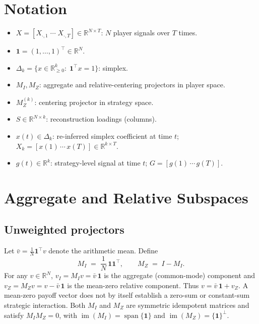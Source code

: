\documentclass[11pt]{article}
\newcommand{\one}{\mathbf{1}}
\newcommand{\R}{\mathbb{R}}
\begin{document}
\section{Notation}
\begin{itemize}[leftmargin=*]
\item $X=[X_{\cdot,1}\;\cdots\;X_{\cdot,T}] \in \R^{N\times T}$: $N$ player signals over $T$ times.
\item $\one=(1,\dots,1)^\top\in\R^N$.
\item $\Delta_k = \{x\in\R^k_{\ge 0}:\;\one^\top x = 1\}$: simplex.
\item $M_I, M_Z$: aggregate and relative-centering projectors in player space.
\item $M^{(k)}_Z$: centering projector in strategy space.
\item $S\in\R^{N\times k}$: reconstruction loadings (columns).
\item $x(t)\in\Delta_k$: re-inferred simplex coefficient at time $t$; $X_k = [x(1)\,\cdots\,x(T)]\in\R^{k\times T}$.
\item $g(t)\in\R^k$: strategy-level signal at time $t$; $G=[g(1)\,\cdots\,g(T)]$.
\end{itemize}

\section{Aggregate and Relative Subspaces}
\subsection{Unweighted projectors}
Let $\bar v = \tfrac{1}{N}\one^\top v$ denote the arithmetic mean. Define
\begin{equation}
\label{eq:unweighted-projectors}
M_I \;=\; \frac{1}{N}\,\one\one^\top,\qquad
M_Z \;=\; I - M_I.
\end{equation}
For any $v\in\R^N$, $v_I=M_Iv=\bar v\,\one$ is the aggregate
(common-mode) component and $v_Z=M_Zv=v-\bar v\,\one$ is the mean-zero
relative component. Thus $v=\bar v\,\one+v_Z$. A mean-zero payoff vector does
not by itself establish a zero-sum or constant-sum strategic interaction. Both
$M_I$ and $M_Z$ are symmetric idempotent matrices and satisfy $M_I M_Z=0$,
with $\operatorname{im}(M_I)=\operatorname{span}\{\one\}$ and
$\operatorname{im}(M_Z)=\{\one\}^\perp$.
\end{document}
